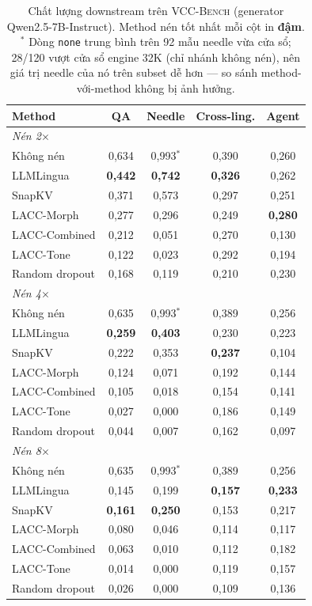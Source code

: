 \documentclass[runningheads]{llncs}
\newcommand{\method}[1]{\textsc{#1}}
\begin{document}
\begin{table}[H]
\centering
\caption{Chất lượng downstream trên \method{VCC-Bench} (generator Qwen2.5-7B-Instruct). Method nén tốt nhất mỗi cột in \textbf{đậm}. $^{*}$ Dòng \texttt{none} trung bình trên 92 mẫu needle vừa cửa sổ; 28/120 vượt cửa sổ engine 32K (chỉ nhánh không nén), nên giá trị needle của nó trên subset dễ hơn --- so sánh method-với-method không bị ảnh hưởng.}
\label{tab:downstream}
\begin{tabular}{lcccc}
\toprule
\textbf{Method} & \textbf{QA} & \textbf{Needle} & \textbf{Cross-ling.} & \textbf{Agent} \\
\midrule
\multicolumn{5}{l}{\emph{Nén 2$\times$}} \\
Không nén & 0,634 & 0,993$^{*}$ & 0,390 & 0,260 \\
LLMLingua & \textbf{0,442} & \textbf{0,742} & \textbf{0,326} & 0,262 \\
SnapKV & 0,371 & 0,573 & 0,297 & 0,251 \\
LACC-Morph & 0,277 & 0,296 & 0,249 & \textbf{0,280} \\
LACC-Combined & 0,212 & 0,051 & 0,270 & 0,130 \\
LACC-Tone & 0,122 & 0,023 & 0,292 & 0,194 \\
Random dropout & 0,168 & 0,119 & 0,210 & 0,230 \\
\midrule
\multicolumn{5}{l}{\emph{Nén 4$\times$}} \\
Không nén & 0,635 & 0,993$^{*}$ & 0,389 & 0,256 \\
LLMLingua & \textbf{0,259} & \textbf{0,403} & 0,230 & 0,223 \\
SnapKV & 0,222 & 0,353 & \textbf{0,237} & 0,104 \\
LACC-Morph & 0,124 & 0,071 & 0,192 & 0,144 \\
LACC-Combined & 0,105 & 0,018 & 0,154 & 0,141 \\
LACC-Tone & 0,027 & 0,000 & 0,186 & 0,149 \\
Random dropout & 0,044 & 0,007 & 0,162 & 0,097 \\
\midrule
\multicolumn{5}{l}{\emph{Nén 8$\times$}} \\
Không nén & 0,635 & 0,993$^{*}$ & 0,389 & 0,256 \\
LLMLingua & 0,145 & 0,199 & \textbf{0,157} & \textbf{0,233} \\
SnapKV & \textbf{0,161} & \textbf{0,250} & 0,153 & 0,217 \\
LACC-Morph & 0,080 & 0,046 & 0,114 & 0,117 \\
LACC-Combined & 0,063 & 0,010 & 0,112 & 0,182 \\
LACC-Tone & 0,014 & 0,000 & 0,119 & 0,157 \\
Random dropout & 0,026 & 0,000 & 0,109 & 0,136 \\
\bottomrule
\end{tabular}
\end{table}
\end{document}
